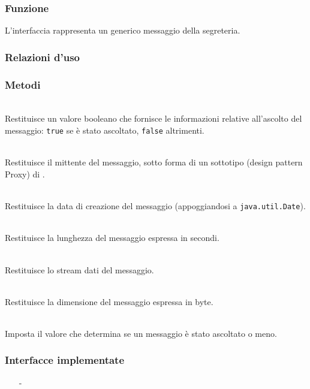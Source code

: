 
\subsubsection*{Funzione}
L'interfaccia rappresenta un generico messaggio della segreteria.

\subsubsection*{Relazioni d'uso}

\subsubsection*{Metodi}
\begin{description}
	\item{}\\
Restituisce un valore booleano che fornisce le informazioni relative all'ascolto del messaggio: \texttt{true} se è stato ascoltato, \texttt{false} altrimenti.
	\item{}\\
Restituisce il mittente del messaggio, sotto forma di un sottotipo (design pattern Proxy) di .
	\item{}\\
Restituisce la data di creazione del messaggio (appoggiandosi a \texttt{java.util.Date}).
	\item{}\\
Restituisce la lunghezza del messaggio espressa in secondi.
	\item{}\\
Restituisce lo stream dati del messaggio.
	\item{}\\
Restituisce la dimensione del messaggio espressa in byte.
	\item{}\\
Imposta il valore che determina se un messaggio è stato ascoltato o meno.

\end{description}


\subsubsection*{Interfacce implementate}
\begin{itemize}[noitemsep,nolistsep]
  \item[-] 
\end{itemize}

